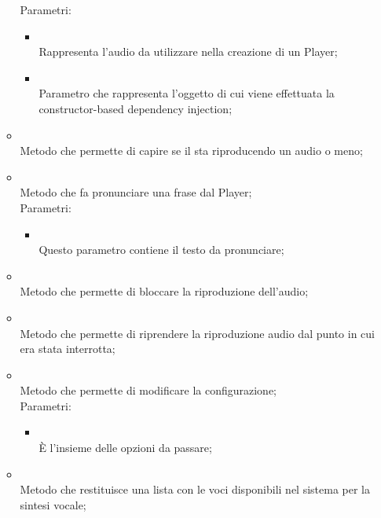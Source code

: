 \begin{itemize}
\begin{itemize}
		Parametri:
		\begin{itemize}
			\item {} \\
			Rappresenta l'audio da utilizzare nella creazione di un Player;
			\item {} \\
			Parametro che rappresenta l'oggetto  di cui viene effettuata la constructor-based dependency injection;
		\end{itemize}
		\item[]  \\
		Metodo che permette di capire se il  sta riproducendo un audio o meno;\\
		\item[]  \\
		Metodo che fa pronunciare una frase dal Player;\\
		Parametri:
		\begin{itemize}
			\item {} \\
			Questo parametro contiene il testo da pronunciare;
		\end{itemize}
		\item[]  \\
		Metodo che permette di bloccare la riproduzione dell'audio;\\
		\item[]  \\
		Metodo che permette di riprendere la riproduzione audio dal punto in cui era stata interrotta;\\
		\item[]  \\
		Metodo che permette di modificare la configurazione;\\
		Parametri:
		\begin{itemize}
			\item {} \\
			È l'insieme delle opzioni da passare;
		\end{itemize}
		\item[]  \\
		Metodo che restituisce una lista con le voci disponibili nel sistema per la sintesi vocale;\\

\end{itemize}
\end{itemize}
